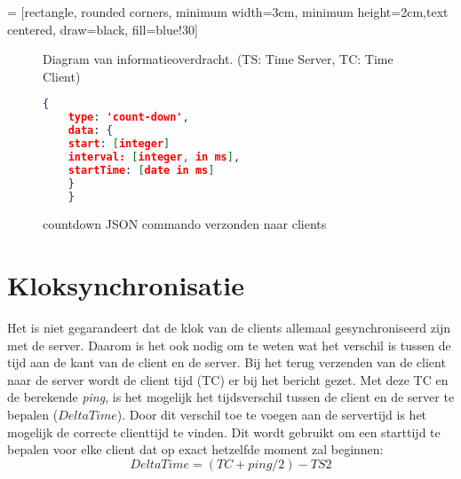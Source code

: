 \documentclass[a4paper,11pt]{article}
\begin{document}
   = [rectangle, rounded corners, minimum width=3cm, minimum height=2cm,text centered, draw=black, fill=blue!30]


  \begin{figure}
    \caption{Diagram van informatieoverdracht. (TS: Time Server, TC: Time Client)} \label{diag}
  \end{figure}

  \begin{figure}
    \begin{lstlisting}[language=json,firstnumber=1]
    {
    type: 'count-down',
    data: {
    start: [integer]
    interval: [integer, in ms],
    startTime: [date in ms]
    }
    }
    \end{lstlisting}
    \caption{countdown JSON commando verzonden naar clients} \label{json2}
  \end{figure}

  \section{Kloksynchronisatie}
  Het is niet gegarandeert dat de klok van de clients allemaal gesynchroniseerd zijn met de server. Daarom is het ook nodig om te weten wat het verschil is tussen de tijd aan de kant van de client en de server.
  Bij het terug verzenden van de client naar de server wordt de client tijd (TC) er bij het bericht gezet. Met deze TC en de berekende {\it ping}, is het mogelijk het tijdsverschil tussen de client en de server te bepalen ($DeltaTime$). Door dit verschil toe te voegen aan de servertijd is het mogelijk de correcte clienttijd te vinden. Dit wordt gebruikt om een starttijd te bepalen voor elke client dat op exact hetzelfde moment zal beginnen:
  \[DeltaTime = (TC+ping/2) - TS2\]
\end{document}
